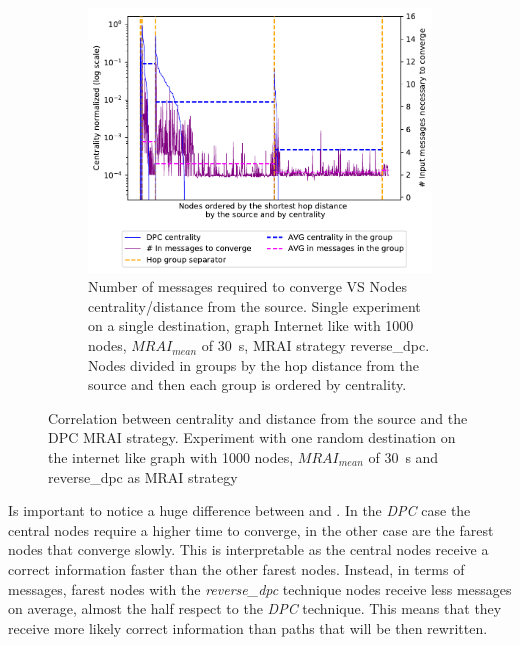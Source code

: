 \documentclass[10pt,conference,letterpaper]{IEEEtran}
\newcommand{\figwidth}{0.78}
\newcommand{\figvspace}{-1.5em}
\begin{document}
\begin{figure}[tb]
	\begin{subfigure}{\columnwidth}
		\centering
		\includegraphics[width=\figwidth\columnwidth]{images/different_destinations/1000-reverse_dpc-d0_node-conv_MRAI30_centVSmsg.pdf}
		\caption{Number of messages required to converge VS Nodes centrality/distance from the source.
				 Single experiment on a single destination, graph Internet like with \num{1000} nodes, $MRAI_{mean}$ of \SI{30}{\second},
				 \ac{MRAI} strategy reverse\_dpc. Nodes divided in groups by the hop distance from the source and then each group is
				 ordered by centrality.}
		\label{fig:1000-reverse-dpc_node_conv_centVSmsg_all}
		\qquad
	\end{subfigure}

	\caption{Correlation between centrality and distance from the source and the \ac{DPC} \ac{MRAI} strategy.
			 Experiment with one random destination on the internet like graph with
			 \num{1000} nodes, $MRAI_{mean}$ of \SI{30}{\second} and reverse\_dpc as
			 \ac{MRAI} strategy}
	\label{fig:1000-reverse-dpc_node_conv_all}
	\vspace{\figvspace}
\end{figure}

Is important to notice a huge difference between 
and . In the \textit{DPC} case
the central nodes require a higher time to converge, in the other case
are the farest nodes that converge slowly.
This is interpretable as the central nodes receive a correct information faster
than the other farest nodes.
Instead, in terms of messages, farest nodes with the \textit{reverse\_dpc}
technique nodes receive less messages on average, almost the half respect
to the \textit{DPC} technique.
This means that they receive more likely correct information than paths
that will be then rewritten.
\end{document}
